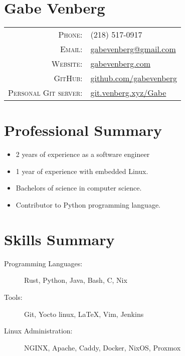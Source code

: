 \documentclass[letterpaper,10pt]{article}
\begin{document}
\pagestyle{empty}%
\section*{Gabe Venberg}
    \begin{tabular}{r l}
    \textsc{Phone:} & (218) 517-0917\\
    \textsc{Email:} & \href{mailto:gabevenberg@gmail.com}{gabevenberg@gmail.com}\\
    \textsc{Website:} & \href{https://gabevenberg.com}{gabevenberg.com}\\
    \textsc{GitHub:} & \href{https://github.com/gabevenberg}{github.com/gabevenberg}\\
    \textsc{Personal Git server:} & \href{https://git.venberg.xyz/Gabe}{git.venberg.xyz/Gabe}\\
    \end{tabular}
\section*{Professional Summary}

\begin{itemize}
    \item 2 years of experience as a software engineer
    \item 1 year of experience with embedded Linux.
    \item Bachelors of science in computer science.
    \item Contributor to Python programming language.
\end{itemize}

\section*{Skills Summary}

\begin{description}
    \item[Programming Languages:] Rust, Python, Java, Bash, C, Nix
    \item[Tools:] Git, Yocto linux, \LaTeX{}, Vim, Jenkins
    \item[Linux Administration:] NGINX, Apache, Caddy, Docker, NixOS, Proxmox
\end{description}
\end{document}
